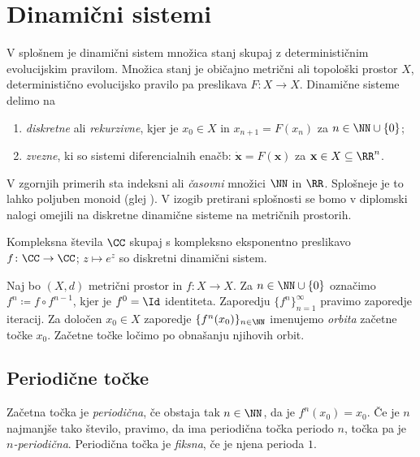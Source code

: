 \section{Dinamični sistemi} \label{sec:dis}

V splošnem je dinamični sistem množica stanj skupaj z determinističnim evolucijskim pravilom. Množica stanj je običajno metrični ali topološki prostor \(X\), deterministično evolucijsko pravilo pa preslikava \(F \colon X \to X\). Dinamične sisteme delimo na

\begin{enumerate}
    \item \emph{diskretne} ali \emph{rekurzivne}, kjer je \(x_0 \in X\) in \(x_{n + 1} = F (x_n)\) za \(n \in \NN \cup \{0\}\);
    \item \emph{zvezne}, ki so sistemi diferencialnih enačb: \(\dot{\mathbf{x}} = F (\mathbf{x})\) za \(\mathbf{x} \in X \subseteq \RR^n\).
\end{enumerate}

\noindent V zgornjih primerih sta indeksni ali \emph{časovni} množici \(\NN\) in \(\RR\). Splošneje je to lahko poljuben monoid (glej \cite{Giunti_2012}). V izogib pretirani splošnosti se bomo v diplomski nalogi omejili na diskretne dinamične sisteme na metričnih prostorih.

\begin{zgled}
    Kompleksna števila \(\CC\) skupaj s kompleksno eksponentno preslikavo \(f \colon \CC \to \CC\); \(z \mapsto e^{z}\) so diskretni dinamični sistem.
\end{zgled}

\noindent Naj bo \((X, d)\) metrični prostor in \(f \colon X \to X\). Za \(n \in \NN \cup \{0\}\) označimo \(f^n \coloneq f \circ f^{n - 1}\), kjer je \(f^0 = \Id\) identiteta. Zaporedju \(\{f^n\}_{n=1}^{\infty}\) pravimo zaporedje iteracij. Za določen \(x_0 \in X\) zaporedje \(\{f^n (x_0)\}_{n \in \NN}\) imenujemo \emph{orbita} začetne točke \(x_0\). Začetne točke ločimo po obnašanju njihovih orbit.

\subsection{Periodične točke}

Začetna točka je \emph{periodična}, če obstaja tak \(n \in \NN\), da je \(f^n (x_0) = x_0\). Če je \(n\) najmanjše tako število, pravimo, da ima periodična točka periodo \(n\), točka pa je \emph{\(n\)-periodična}. Periodična točka je \emph{fiksna}, če je njena perioda \(\num{1}\).

